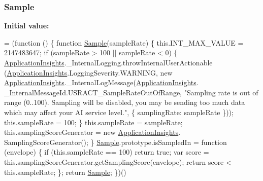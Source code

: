 \subsubsection[{\texorpdfstring{Sample}{Sample}}]{ Sample}\hypertarget{_scripts_2ai_80_822_89-build00167_8js_ac4c96e06e96de046ca267f77e98c2cf6}{}\label{_scripts_2ai_80_822_89-build00167_8js_ac4c96e06e96de046ca267f77e98c2cf6}
{\bfseries Initial value\+:}
\begin{DoxyCode}
= (\textcolor{keyword}{function} () \{
                \textcolor{keyword}{function} \hyperlink{obj_2_release_2_package_2_package_tmp_2_scripts_2ai_80_822_89-build00167_8js_ac4c96e06e96de046ca267f77e98c2cf6}{Sample}(sampleRate) \{
                    this.INT\_MAX\_VALUE = 2147483647;
                    \textcolor{keywordflow}{if} (sampleRate > 100 || sampleRate < 0) \{
                        \hyperlink{obj_2_release_2_package_2_package_tmp_2_scripts_2ai_80_822_89-build00167_8js_aa415ef4f8cdd699689ef4b61db7656d8}{ApplicationInsights}.\_InternalLogging.throwInternalUserActionable
      (\hyperlink{obj_2_release_2_package_2_package_tmp_2_scripts_2ai_80_822_89-build00167_8js_aa415ef4f8cdd699689ef4b61db7656d8}{ApplicationInsights}.LoggingSeverity.WARNING, \textcolor{keyword}{new} 
      \hyperlink{obj_2_release_2_package_2_package_tmp_2_scripts_2ai_80_822_89-build00167_8js_aa415ef4f8cdd699689ef4b61db7656d8}{ApplicationInsights}.\_InternalLogMessage(\hyperlink{obj_2_release_2_package_2_package_tmp_2_scripts_2ai_80_822_89-build00167_8js_aa415ef4f8cdd699689ef4b61db7656d8}{ApplicationInsights}.
      \_InternalMessageId.USRACT\_SampleRateOutOfRange, \textcolor{stringliteral}{"Sampling rate is out of range (0..100). Sampling will be disabled,
       you may be sending too much data which may affect your AI service level."}, \{ samplingRate: sampleRate \}));
                        this.sampleRate = 100;
                    \}
                    this.sampleRate = sampleRate;
                    this.samplingScoreGenerator = \textcolor{keyword}{new} \hyperlink{obj_2_release_2_package_2_package_tmp_2_scripts_2ai_80_822_89-build00167_8js_aa415ef4f8cdd699689ef4b61db7656d8}{ApplicationInsights}.
      SamplingScoreGenerator();
                \}
                \hyperlink{obj_2_release_2_package_2_package_tmp_2_scripts_2ai_80_822_89-build00167_8js_ac4c96e06e96de046ca267f77e98c2cf6}{Sample}.prototype.isSampledIn = \textcolor{keyword}{function} (envelope) \{
                    \textcolor{keywordflow}{if} (this.sampleRate == 100)
                        \textcolor{keywordflow}{return} \textcolor{keyword}{true};
                    var score = this.samplingScoreGenerator.getSamplingScore(envelope);
                    \textcolor{keywordflow}{return} score < this.sampleRate;
                \};
                \textcolor{keywordflow}{return} \hyperlink{obj_2_release_2_package_2_package_tmp_2_scripts_2ai_80_822_89-build00167_8js_ac4c96e06e96de046ca267f77e98c2cf6}{Sample};
            \})()
\end{DoxyCode}


